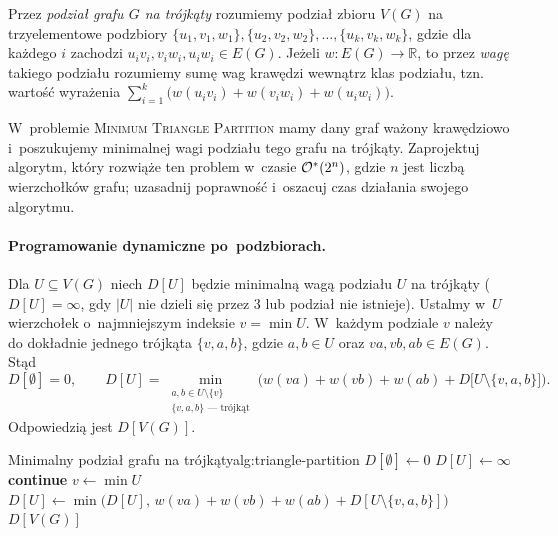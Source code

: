 \clearpage
\begin{zadanie}
	Przez \emph{podział grafu $G$ na trójkąty} rozumiemy podział zbioru $V(G)$ na
	trzyelementowe podzbiory $\{u_1,v_1,w_1\},\{u_2,v_2,w_2\},\dots,\{u_k,v_k,w_k\}$,
	gdzie dla każdego $i$ zachodzi $u_iv_i,v_iw_i,u_iw_i\in E(G)$. Jeżeli
	$w\colon E(G)\to\mathbb{R}$, to przez \emph{wagę} takiego podziału rozumiemy sumę
	wag krawędzi wewnątrz klas podziału, tzn. wartość wyrażenia
	$\sum_{i=1}^{k}\big(w(u_iv_i)+w(v_iw_i)+w(u_iw_i)\big)$.

	W~problemie \textsc{Minimum Triangle Partition} mamy dany graf ważony krawędziowo
	i~poszukujemy minimalnej wagi podziału tego grafu na trójkąty. Zaprojektuj
	algorytm, który rozwiąże ten problem w~czasie $\mathcal{O}^*(2^n)$, gdzie $n$ jest liczbą
	wierzchołków grafu; uzasadnij poprawność i~oszacuj czas działania swojego algorytmu.
\end{zadanie}

\label{sol:triangle-partition}
\paragraph{Programowanie dynamiczne po~podzbiorach.}
Dla $U\subseteq V(G)$ niech $D[U]$ będzie minimalną wagą podziału $U$ na trójkąty
($D[U]=\infty$, gdy $|U|$ nie dzieli się przez $3$ lub podział nie istnieje).
Ustalmy w~$U$ wierzchołek o~najmniejszym indeksie $v=\min U$. W~każdym podziale
$v$ należy do dokładnie jednego trójkąta $\{v,a,b\}$, gdzie $a,b\in U$ oraz
$va,vb,ab\in E(G)$. Stąd
\[
	D[\emptyset]=0,\qquad
	D[U]=\min_{\substack{a,b\in U\setminus\{v\}\\ \{v,a,b\}\text{ --- trójkąt}}}
	\Big(w(va)+w(vb)+w(ab)+D\big[U\setminus\{v,a,b\}\big]\Big).
\]
Odpowiedzią jest $D[V(G)]$.

\begin{alg}{Minimalny podział grafu na trójkąty}{alg:triangle-partition}
	\State $D[\emptyset]\gets 0$
	\State $D[U]\gets\infty$
	\State \textbf{continue}
	\EndIf
	\State $v\gets\min U$
	\State $D[U]\gets\min\big(D[U],\,w(va)+w(vb)+w(ab)+D[U\setminus\{v,a,b\}]\big)$
	\EndIf
	\EndFor
	\EndFor
	\State \Return $D[V(G)]$
	\EndFunction
\end{alg}

